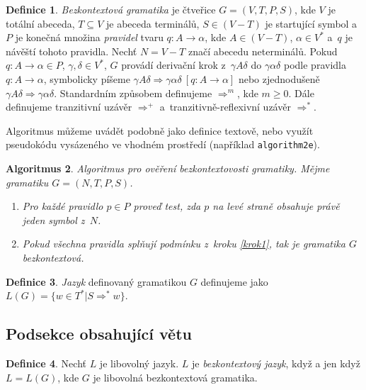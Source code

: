 \documentclass[a4paper,11pt,twocolumn,titlepage]{article}
\theoremstyle{definition}
\newtheorem{definition}{Definice}[section]
\theoremstyle{plain}
\newtheorem{algorithm}[definition]{Algoritmus}
\begin{document}
\begin{definition} 
\label{definicia1.1}
\emph{ Bezkontextová gramatika} je čtveřice $G=(V,T,P,S)$, kde $V$ je totální abeceda,
$T\subseteq V$ je abeceda terminálů, $S \in (V - T)$ je startující symbol a~$P$ je konečná množina \emph{pravidel}
tvaru $q\colon A \rightarrow \alpha$, kde $A\in (V - T)$, $\alpha \in V^*$ a~$q$ je návěští tohoto pra\-vi\-dla. Nechť $N=V-T$ značí abecedu neterminálů.
Po\-kud $q\colon A\rightarrow \alpha \in P$, $\gamma, \delta \in V^*$, $G$ provádí derivační krok z~$\gamma A \delta$ do $\gamma \alpha \delta$ podle pravidla $q \colon A \rightarrow \alpha$, sym\-bolicky píšeme $\gamma A \delta \Rightarrow \gamma \alpha \delta \ [q \colon A \rightarrow \alpha]$ nebo zjed\-noduše\-ně $\gamma A \delta \Rightarrow \gamma \alpha \delta$. Standardním způsobem definu\-jeme $\Rightarrow ^m$, kde $m \ge 0$. Dále definujeme 
tranzitivní uzávěr $\Rightarrow^+$ a~tranzitivně-reflexivní uzávěr $\Rightarrow^*$.
\end{definition}
	
Algoritmus můžeme uvádět podobně jako definice \mbox{textově}, nebo využít pseudokódu vysázeného ve vhodném prostředí (například \texttt{algorithm2e}).

\begin{algorithm} 
Algoritmus pro ověření bezkontextovosti gramatiky. Mějme gramatiku $G=(N,T,P,S)$.
	\begin{enumerate}
 		\item \label{krok1} Pro každé pravidlo $p\in P$ proveď test, zda $p$ na levé straně obsahuje právě jeden symbol z~$N$.
 		\item Pokud všechna pravidla splňují podmínku z~kroku \ref{krok1}, tak je gramatika $G$ bezkontextová.
 	\end{enumerate}
\end{algorithm}

\begin{definition} 
	\emph{ Jazyk} definovaný gramatikou $G$ definujeme jako $L(G)=\{w\in T^*|S \Rightarrow^*w\}$. 
\end{definition}

\subsection{Podsekce obsahující větu}

\begin{definition} 
Nechť $L$ je libovolný jazyk. $L$ je \emph{bezkontextový jazyk}, když a jen když $L=L(G)$, kde $G$ je libovolná bezkontextová gramatika.
\end{definition}
\end{document}
